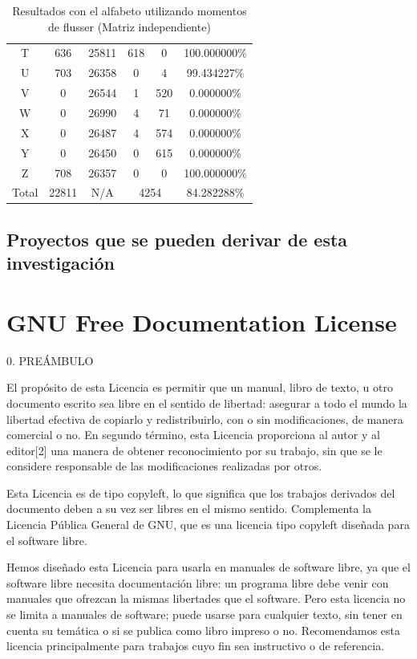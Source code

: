 \documentclass[a4paper, 11pt, oneside]{report}
\begin{document}
\begin{table}
\begin{tabular}{|c|c|c|c|c|c|}
	T & 636 & 25811 & 618 & 0 & 100.000000\% \\ 
	U & 703 & 26358 & 0 & 4 & 99.434227\% \\ 
	V & 0 & 26544 & 1 & 520 & 0.000000\% \\ 
	W & 0 & 26990 & 4 & 71 & 0.000000\% \\ 
	X & 0 & 26487 & 4 & 574 & 0.000000\% \\ 
	Y & 0 & 26450 & 0 & 615 & 0.000000\% \\ 
	Z & 708 & 26357 & 0 & 0 & 100.000000\% \\ 
	\hline
	Total & 22811 & N/A & \multicolumn{2}{|c|}{4254} & 84.282288\% \\
	\hline
\end{tabular}
\caption{Resultados con el alfabeto utilizando momentos de flusser (Matriz independiente)}
\label{tb:alphaRotIndep}
\end{table}

\section{Proyectos que se pueden derivar de esta investigación}


\chapter{GNU Free Documentation License}

0. PREÁMBULO

El propósito de esta Licencia es permitir que un manual, libro de texto, u otro documento escrito sea libre en el sentido de libertad: asegurar a todo el mundo la libertad efectiva de copiarlo y redistribuirlo, con o sin modificaciones, de manera comercial o no. En segundo término, esta Licencia proporciona al autor y al editor[2] una manera de obtener reconocimiento por su trabajo, sin que se le considere responsable de las modificaciones realizadas por otros.

Esta Licencia es de tipo copyleft, lo que significa que los trabajos derivados del documento deben a su vez ser libres en el mismo sentido. Complementa la Licencia Pública General de GNU, que es una licencia tipo copyleft diseñada para el software libre.

Hemos diseñado esta Licencia para usarla en manuales de software libre, ya que el software libre necesita documentación libre: un programa libre debe venir con manuales que ofrezcan la mismas libertades que el software. Pero esta licencia no se limita a manuales de software; puede usarse para cualquier texto, sin tener en cuenta su temática o si se publica como libro impreso o no. Recomendamos esta licencia principalmente para trabajos cuyo fin sea instructivo o de referencia.
\end{document}
